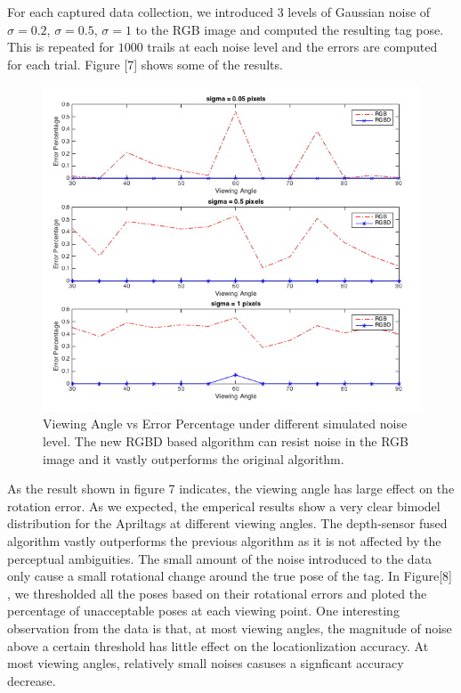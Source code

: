 For each captured data collection, we introduced 3 levels of Gaussian noise of $\sigma = 0.2$, $\sigma = 0.5$, $\sigma = 1$  to the RGB image and computed the resulting tag pose. This is repeated for $1000$ trails at each noise level and the errors are computed for each trial. Figure [7] shows some of the results. 
\begin{figure}
\centering
\includegraphics[width=\columnwidth]{figs/viewing_angle_fig1}
\caption{Viewing Angle vs Error Percentage under different simulated noise level. The new RGBD based algorithm can resist noise in the RGB image and it vastly outperforms the original algorithm.
}
\end{figure}

As the result shown in figure 7 indicates, the viewing angle has large effect on the rotation error. As we expected, the emperical results show a very clear bimodel distribution for the Apriltags at different viewing angles. The depth-sensor fused algorithm vastly outperforms the previous algorithm as it is not affected by the perceptual ambiguities. The small amount of the noise introduced to the data only cause a small rotational change around the true pose of the tag. In Figure[8] , we thresholded all the poses based on their rotational errors and ploted the percentage of unacceptable poses at each viewing point. One interesting observation from the data is that, at most viewing angles, the magnitude of noise above a certain threshold has little effect on the locationlization accuracy. At most viewing angles, relatively small noises casuses a signficant accuracy decrease. 
